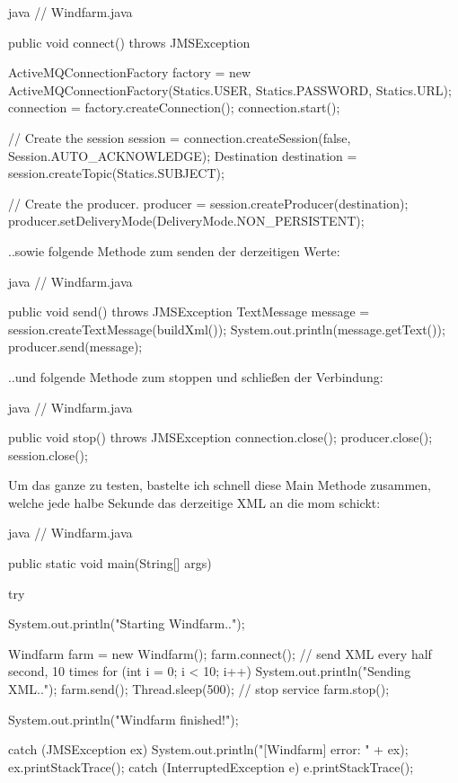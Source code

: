 \begin{code}{java}
// Windfarm.java

public void connect() throws JMSException {
    ActiveMQConnectionFactory factory = new ActiveMQConnectionFactory(Statics.USER, Statics.PASSWORD, Statics.URL);
    connection = factory.createConnection();
    connection.start();

    // Create the session
    session = connection.createSession(false, Session.AUTO_ACKNOWLEDGE);
    Destination destination = session.createTopic(Statics.SUBJECT);

    // Create the producer.
    producer = session.createProducer(destination);
    producer.setDeliveryMode(DeliveryMode.NON_PERSISTENT);
}
\end{code}

..sowie folgende Methode zum senden der derzeitigen Werte:

\begin{code}{java}
// Windfarm.java

public void send() throws JMSException {
    TextMessage message = session.createTextMessage(buildXml());
    System.out.println(message.getText());
    producer.send(message);
}
\end{code}

..und folgende Methode zum stoppen und schließen der Verbindung:

\begin{code}{java}
// Windfarm.java

public void stop() throws JMSException {
    connection.close();
    producer.close();
    session.close();
}
\end{code}

Um das ganze zu testen, bastelte ich schnell diese Main Methode zusammen, welche jede halbe Sekunde das derzeitige XML an die \gls{mom} schickt:

\begin{code}{java}
// Windfarm.java

public static void main(String[] args) {
    try {
        System.out.println("Starting Windfarm..");

        Windfarm farm = new Windfarm();
        farm.connect();
        // send XML every half second, 10 times
        for (int i = 0; i < 10; i++) {
            System.out.println("Sending XML..");
            farm.send();
            Thread.sleep(500);
        }
        // stop service
        farm.stop();

        System.out.println("Windfarm finished!");
    } catch (JMSException ex) {
        System.out.println("[Windfarm] error: " + ex);
        ex.printStackTrace();
    } catch (InterruptedException e) {
        e.printStackTrace();
    }
}
\end{code}

